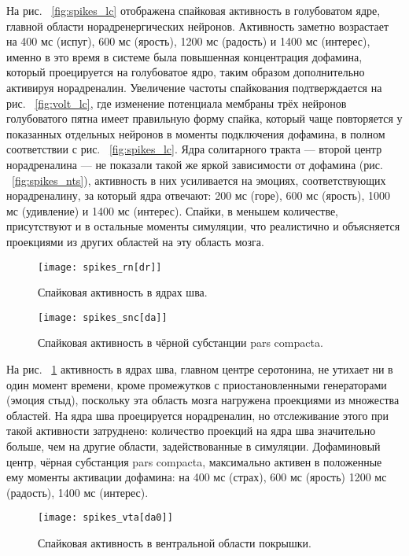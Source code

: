 На рис.  ~\ref{fig:spikes_lc} отображена спайковая активность в голубоватом ядре, главной области норадренергических нейронов. Активность заметно возрастает на 400 мс (испуг), 600 мс (ярость), 1200 мс (радость) и 1400 мс (интерес), именно в это время в системе была повышенная концентрация дофамина, который проецируется на голубоватое ядро, таким образом дополнительно активируя норадреналин. Увеличение частоты спайкования подтверждается на рис. ~\ref{fig:volt_lc}, где изменение потенциала мембраны трёх нейронов голубоватого пятна имеет правильную форму спайка, который чаще повторяется у показанных отдельных нейронов в моменты подключения дофамина, в полном соответствии с рис.  ~\ref{fig:spikes_lc}. Ядра солитарного тракта --- второй центр норадреналина --- не показали такой же яркой зависимости от дофамина (рис. ~\ref{fig:spikes_nts}), активность в них усиливается на эмоциях, соответствующих норадреналину, за который ядра отвечают: 200 мс (горе), 600 мс (ярость), 1000 мс (удивление) и 1400 мс (интерес). Спайки, в меньшем количестве, присутствуют и в остальные моменты симуляции, что реалистично и объясняется проекциями из других областей на эту область мозга.

\begin{figure}
	\centering
	\texttt{[image: spikes\_rn[dr]]}
	\caption{Спайковая активность в ядрах шва.}
	\label{fig:spikes_rn}
\end{figure}

\begin{figure}
	\centering
	\texttt{[image: spikes\_snc[da]]}
	\caption{Спайковая активность в чёрной субстанции pars compacta.}
	\label{fig:spikes_snc}
\end{figure}

На рис. ~\ref{fig:spikes_rn} активность в ядрах шва, главном центре серотонина, не утихает ни в один момент времени, кроме промежутков с приостановленными генераторами (эмоция стыд), поскольку эта область мозга нагружена проекциями из множества областей. На ядра шва проецируется норадреналин, но отслеживание этого при такой активности затруднено: количество проекций на ядра шва значительно больше, чем на другие области, задействованные в симуляции. Дофаминовый центр, чёрная субстанция pars compacta, максимально активен в положенные ему моменты активации дофамина: на 400 мс (страх), 600 мс (ярость) 1200 мс (радость), 1400 мс (интерес).

\begin{figure}
	\centering
	\texttt{[image: spikes\_vta[da0]]}
	\caption{Спайковая активность в вентральной области покрышки.}
	\label{fig:spikes_vta}
\end{figure}

